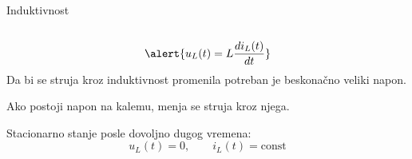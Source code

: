 \begin{frame}[label=08-s064]{Induktivnost}
\begin{columns}[c,onlytextwidth]
\centering
{}\centering
\end{columns}\medskip
\[\alert{u_L(t)=L\frac{di_L(t)}{dt}}\]
Da bi se struja kroz induktivnost promenila potreban je beskonačno veliki napon.\par
Ako postoji napon na kalemu, menja se struja kroz njega.\par\medskip
Stacionarno stanje posle dovoljno dugog vremena:
\[u_L(t)=0,\qquad i_L(t)=\mathrm{const}\]
\end{frame}
